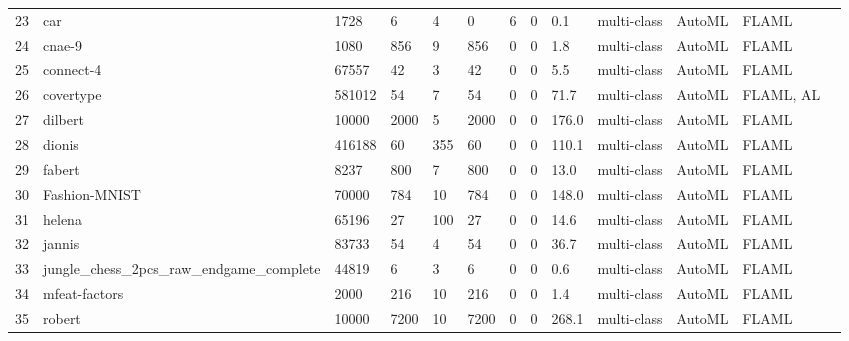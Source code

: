 \begin{table*}
\begin{tabular}{lllllllllllll}
23  & car                                         & 1728    & 6      & 4     & 0     & 6      & 0         & 0.1       & multi-class & AutoML & FLAML            \\
24  & cnae-9                                      & 1080    & 856    & 9     & 856   & 0      & 0         & 1.8       & multi-class & AutoML & FLAML            \\
25  & connect-4                                   & 67557   & 42     & 3     & 42    & 0      & 0         & 5.5       & multi-class & AutoML & FLAML            \\
26  & covertype                                   & 581012  & 54     & 7     & 54    & 0      & 0         & 71.7      & multi-class & AutoML & FLAML, AL        \\
27  & dilbert                                     & 10000   & 2000   & 5     & 2000  & 0      & 0         & 176.0     & multi-class & AutoML & FLAML            \\
28  & dionis                                      & 416188  & 60     & 355   & 60    & 0      & 0         & 110.1     & multi-class & AutoML & FLAML            \\
29  & fabert                                      & 8237    & 800    & 7     & 800   & 0      & 0         & 13.0      & multi-class & AutoML & FLAML            \\
30  & Fashion-MNIST                               & 70000   & 784    & 10    & 784   & 0      & 0         & 148.0     & multi-class & AutoML & FLAML            \\
31  & helena                                      & 65196   & 27     & 100   & 27    & 0      & 0         & 14.6      & multi-class & AutoML & FLAML            \\
32  & jannis                                      & 83733   & 54     & 4     & 54    & 0      & 0         & 36.7      & multi-class & AutoML & FLAML            \\
33  & jungle\_chess\_2pcs\_raw\_endgame\_complete & 44819   & 6      & 3     & 6     & 0      & 0         & 0.6       & multi-class & AutoML & FLAML            \\
34  & mfeat-factors                               & 2000    & 216    & 10    & 216   & 0      & 0         & 1.4       & multi-class & AutoML & FLAML            \\
35  & robert                                      & 10000   & 7200   & 10    & 7200  & 0      & 0         & 268.1     & multi-class & AutoML & FLAML            \\

\end{tabular}
\end{table*}
